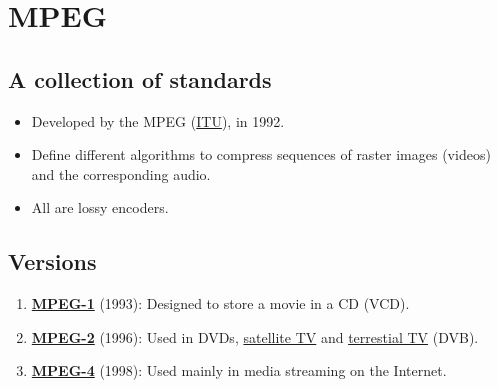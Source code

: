 \chapter{\gls{MPEG}}
\label{cha:MPEG}

\section{A collection of standards}
\begin{itemize}
\item Developed by the \gls{MPEG} (\href{https://www.itu.int}{ITU}),
  in 1992.
\item Define different algorithms to compress sequences of raster
  images (videos) and the corresponding audio.
\item All are lossy encoders.
\end{itemize}

\section{Versions}
\begin{enumerate}
\item \href{https://en.wikipedia.org/wiki/MPEG-1}{\textbf{MPEG-1}}
  (1993): Designed to store a movie in a \gls{CD} (\gls{VCD}).
\item \href{https://en.wikipedia.org/wiki/MPEG-2}{\textbf{MPEG-2}}
  (1996): Used in \glspl{DVD}, \href{https://en.wikipedia.org/wiki/Satellite_television}{satellite TV} and \href{https://en.wikipedia.org/wiki/Digital_television}{terrestial TV} (\gls{DVB}).
\item \href{https://en.wikipedia.org/wiki/MPEG-4}{\textbf{MPEG-4}}
  (1998): Used mainly in media streaming on the Internet.
\end{enumerate}

